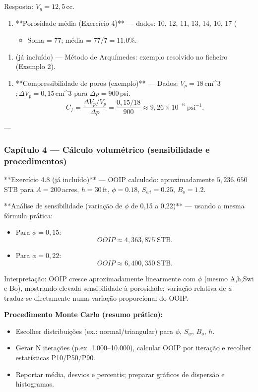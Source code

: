 \documentclass[11pt,a4paper]{article}
\begin{document}
Resposta: $V_g=12{,}5\,$cc.

\begin{enumerate}
\item **Porosidade média (Exercício 4)** — dados: 10, 12, 11, 13, 14, 10, 17 (%
\begin{itemize}
\item Soma = 77; média = $77/7 = 11.0\%$.
\end{itemize}
\end{enumerate}

\begin{enumerate}
\item (já incluído) — Método de Arquímedes: exemplo resolvido no ficheiro (Exemplo 2).
\end{enumerate}

\begin{enumerate}
\item **Compressibilidade de poros (exemplo)** — Dados: $V_p=18\,$cm^3$; \Delta V_p=0{,}15\,$cm^3 para $\Delta p=900\,$psi.
$$C_f=\dfrac{\Delta V_p/V_p}{\Delta p}=\dfrac{0{,}15/18}{900}\approx9{,}26\times10^{-6}\;\text{psi}^{-1}.$$ 
\end{enumerate}

---

\subsubsection{Capítulo 4 — Cálculo volumétrico (sensibilidade e procedimentos)}

**Exercício 4.8 (já incluído)** — OOIP calculado: aproximadamente $5{,}236{,}650\,$STB para $A=200\,$acres, $h=30\,$ft, $\phi=0.18$, $S_{wi}=0.25$, $B_o=1.2$.

**Análise de sensibilidade (variação de $\phi$ de 0{,}15 a 0{,}22)** — usando a mesma fórmula prática:
\begin{itemize}
\item Para $\phi=0{,}15$:
$$OOIP\approx4{,}363{,}875\;\text{STB}.$$ 
\item Para $\phi=0{,}22$:
$$OOIP\approx6{,}400{,}350\;\text{STB}.$$ 
\end{itemize}

Interpretação: OOIP cresce aproximadamente linearmente com $\phi$ (mesmo A,h,Swi e Bo), mostrando elevada sensibilidade à porosidade; variação relativa de $\phi$ traduz‑se diretamente numa variação proporcional do OOIP.

\textbf{Procedimento Monte Carlo (resumo prático):}
\begin{itemize}
\item Escolher distribuições (ex.: normal/triangular) para $\phi$, $S_w$, $B_o$, $h$.
\item Gerar N iterações (p.ex. 1.000–10.000), calcular OOIP por iteração e recolher estatísticas P10/P50/P90.
\item Reportar média, desvios e percentis; preparar gráficos de dispersão e histogramas.
\end{itemize}
\end{document}
